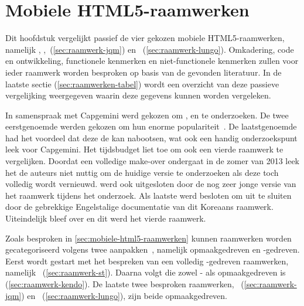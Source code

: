 \chapter{Mobiele HTML5-raamwerken}
\label{chap:raamwerken}

Dit hoofdstuk vergelijkt passief de vier gekozen mobiele HTML5-raamwerken, namelijk \st{}, \kendo{},\jqm{}~(\ref{sec:raamwerk-jqm}) en \lungo{}~(\ref{sec:raamwerk-lungo}).
Omkadering, code en ontwikkeling, functionele kenmerken en niet-functionele kenmerken zullen voor ieder raamwerk worden besproken op basis van de gevonden literatuur.
In de laatste sectie (\ref{sec:raamwerken-tabel}) wordt een overzicht van deze passieve vergelijking weergegeven waarin deze gegevens kunnen worden vergeleken.

In samenspraak met Capgemini werd gekozen om \jqm{}, \st{} en \kendo{} te onderzoeken.
De twee eerstgenoemde werden gekozen om hun enorme populariteit~\cite{Firtman2013,Hales2012,Oeflman2011,David2011}.
De laatstgenoemde had het voordeel dat deze de  kan nabootsen, wat ook een handig onderzoekspunt leek voor Capgemini.
Het tijdsbudget liet toe om ook een vierde raamwerk te vergelijken.
Doordat \tmp{} een volledige make-over ondergaat in de zomer van 2013 leek het de auteurs niet nuttig om de huidige versie te onderzoeken als deze toch volledig wordt vernieuwd.
\moobile{} werd ook uitgesloten door de nog zeer jonge versie van het raamwerk tijdens het onderzoek.
Als laatste werd besloten om \davinci{} uit te sluiten door de gebrekkige Engelstalige documentatie van dit Koreaans raamwerk.
Uiteindelijk bleef \lungo{} over en dit werd het vierde raamwerk.

Zoals besproken in \ref{sec:mobiele-html5-raamwerken} kunnen raamwerken worden gecategoriseerd volgens twee aanpakken~\cite{Oeflman2011}, namelijk opmaakgedreven en \js{}-gedreven. 
Eerst wordt gestart met het bespreken van een volledig \js{}-gedreven raamwerken, namelijk \st{}~(\ref{sec:raamwerk-st}).
Daarna volgt \kendo{} die zowel \js{}- als opmaakgedreven is (\ref{sec:raamwerk-kendo}).
De laatste twee besproken raamwerken, \jqm{}~(\ref{sec:raamwerk-jqm}) en \lungo{}~(\ref{sec:raamwerk-lungo}), zijn beide opmaakgedreven.

